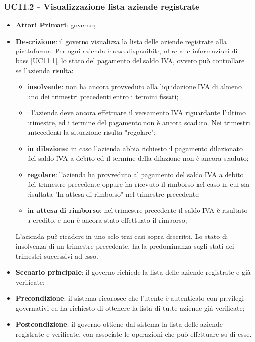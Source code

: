 \subsubsection{UC11.2 - Visualizzazione lista aziende registrate}
 \begin{itemize}
	\item \textbf{Attori Primari}: governo;
	\item \textbf{Descrizione}: il governo visualizza la lista delle aziende registrate alla piattaforma. Per ogni azienda è reso disponibile, oltre alle informazioni di base [UC11.1], lo stato del pagamento del saldo IVA, ovvero può controllare se l'azienda risulta:
	\begin{itemize}
		\item \textbf{insolvente}: non ha ancora provveduto alla liquidazione IVA di almeno uno dei trimestri precedenti entro i termini fissati;
		\item {}: l'azienda deve ancora effettuare il versamento IVA riguardante l'ultimo trimestre, ed i termine del pagamento non è ancora scaduto. Nei trimestri antecedenti la situazione risulta "regolare";
	    \item \textbf{in dilazione}: in caso l'azienda abbia richiesto il pagamento dilazionato del saldo IVA a debito ed il termine della dilazione non è ancora scaduto;
		\item \textbf{regolare}: l'azienda ha provveduto al pagamento del saldo IVA a debito del trimestre precedente oppure ha ricevuto il rimborso nel caso in cui sia risultata "In attesa di rimborso" nel trimestre precedente;
		\item \textbf{in attesa di rimborso}: nel trimestre precedente il saldo IVA è risultato a credito, e non è ancora stato effettuato il rimborso;
	\end{itemize}
	L'azienda può ricadere in uno solo trai casi sopra descritti. Lo stato di insolvenza di un trimestre precedente, ha la predominanza sugli stati dei trimestri successivi ad esso.
	\item \textbf{Scenario principale}: il governo richiede la lista delle aziende registrate e  già verificate;
	\item \textbf{Precondizione}: il sistema riconosce che l'utente è autenticato con privilegi governativi ed ha richiesto di ottenere la lista di tutte aziende già verificate;
	\item \textbf{Postcondizione}: il governo ottiene dal sistema la lista delle aziende registrate e verificate, con associate le operazioni che può effettuare su di esse.
\end{itemize}
